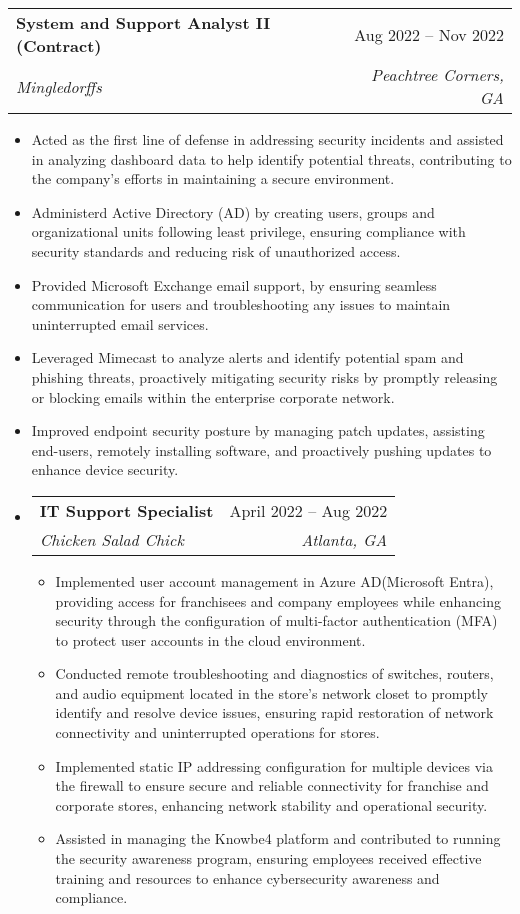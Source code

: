 \documentclass[letterpaper,11pt]{article}
\makeatletter
\newcommand{\resumeItem}[1]{
  \item\small{
    {#1 \vspace{-2pt}}
  }
}
\newcommand{\resumeSubheading}[4]{
  \vspace{-2pt}\item
    \begin{tabular*}{0.97\textwidth}[t]{l@{\extracolsep{\fill}}r}
      \textbf{#1} & #2 \\
      \textit{\small#3} & \textit{\small #4} \\
    \end{tabular*}\vspace{-7pt}
}
\newcommand{\resumeSubHeadingListEnd}{\end{itemize}}
\newcommand{\resumeItemListStart}{\begin{itemize}}
\newcommand{\resumeItemListEnd}{\end{itemize}\vspace{-5pt}}
\makeatother
\begin{document}
    \resumeSubheading
      {System and Support Analyst II (Contract)}{Aug 2022 -- Nov 2022}
      {Mingledorffs}{Peachtree Corners, GA}
      \resumeItemListStart
        \resumeItem{Acted as the first line of defense in addressing security incidents and assisted in analyzing dashboard data to help identify potential threats, contributing to the company's efforts in maintaining a secure environment.}
        \resumeItem{Administerd Active Directory (AD) by creating users, groups and organizational units following least privilege, ensuring compliance with security standards and reducing risk of unauthorized access.}
        \resumeItem{Provided Microsoft Exchange email support, by ensuring seamless communication for users and troubleshooting any issues to maintain uninterrupted email services.}
        \resumeItem{Leveraged Mimecast to analyze alerts and identify potential spam and phishing threats, proactively mitigating security risks by promptly releasing or blocking emails within the enterprise corporate network.}
        \resumeItem{Improved endpoint security posture by managing patch updates, assisting end-users, remotely installing software, and proactively pushing updates to enhance device security.}
        
    \resumeSubheading
        {IT Support Specialist}{April 2022 -- Aug 2022}
        {Chicken Salad Chick}{Atlanta, GA}
        \resumeItemListStart
          \resumeItem{Implemented user account management in Azure AD(Microsoft Entra), providing access for franchisees and company employees while enhancing security through the configuration of multi-factor authentication (MFA) to protect user accounts in the cloud environment.}
          \resumeItem{Conducted remote troubleshooting and diagnostics of switches, routers, and audio equipment located in the store's network closet to promptly identify and resolve device issues, ensuring rapid restoration of network connectivity and uninterrupted operations for stores.}
          \resumeItem{Implemented static IP addressing configuration for multiple devices via the firewall to ensure secure and reliable connectivity for franchise and corporate stores, enhancing network stability and operational security.}
          \resumeItem{Assisted in managing the Knowbe4 platform and contributed to running the security awareness program, ensuring employees received effective training and resources to enhance cybersecurity awareness and compliance.}
          
  
      \resumeItemListEnd

  \resumeSubHeadingListEnd
\end{document}
